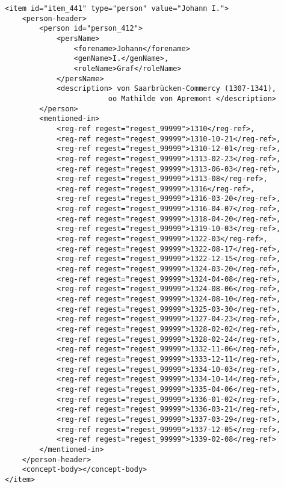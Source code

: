 \begin{verbatim}
<item id="item_441" type="person" value="Johann I.">
    <person-header>
        <person id="person_412">
            <persName>
                <forename>Johann</forename>
                <genName>I.</genName>,
                <roleName>Graf</roleName>
            </persName>
            <description> von Saarbrücken-Commercy (1307-1341),
                        oo Mathilde von Apremont </description>
        </person>
        <mentioned-in>
            <reg-ref regest="regest_99999">1310</reg-ref>,
            <reg-ref regest="regest_99999">1310-10-21</reg-ref>,
            <reg-ref regest="regest_99999">1310-12-01</reg-ref>,
            <reg-ref regest="regest_99999">1313-02-23</reg-ref>,
            <reg-ref regest="regest_99999">1313-06-03</reg-ref>,
            <reg-ref regest="regest_99999">1313-08</reg-ref>,
            <reg-ref regest="regest_99999">1316</reg-ref>,
            <reg-ref regest="regest_99999">1316-03-20</reg-ref>,
            <reg-ref regest="regest_99999">1316-04-07</reg-ref>,
            <reg-ref regest="regest_99999">1318-04-20</reg-ref>,
            <reg-ref regest="regest_99999">1319-10-03</reg-ref>,
            <reg-ref regest="regest_99999">1322-03</reg-ref>,
            <reg-ref regest="regest_99999">1322-08-17</reg-ref>,
            <reg-ref regest="regest_99999">1322-12-15</reg-ref>,
            <reg-ref regest="regest_99999">1324-03-20</reg-ref>,
            <reg-ref regest="regest_99999">1324-04-08</reg-ref>,
            <reg-ref regest="regest_99999">1324-08-06</reg-ref>,
            <reg-ref regest="regest_99999">1324-08-10</reg-ref>,
            <reg-ref regest="regest_99999">1325-03-30</reg-ref>,
            <reg-ref regest="regest_99999">1327-04-23</reg-ref>,
            <reg-ref regest="regest_99999">1328-02-02</reg-ref>,
            <reg-ref regest="regest_99999">1328-02-24</reg-ref>,
            <reg-ref regest="regest_99999">1332-11-06</reg-ref>,
            <reg-ref regest="regest_99999">1333-12-11</reg-ref>,
            <reg-ref regest="regest_99999">1334-10-03</reg-ref>,
            <reg-ref regest="regest_99999">1334-10-14</reg-ref>,
            <reg-ref regest="regest_99999">1335-04-06</reg-ref>,
            <reg-ref regest="regest_99999">1336-01-02</reg-ref>,
            <reg-ref regest="regest_99999">1336-03-21</reg-ref>,
            <reg-ref regest="regest_99999">1337-03-29</reg-ref>,
            <reg-ref regest="regest_99999">1337-12-05</reg-ref>,
            <reg-ref regest="regest_99999">1339-02-08</reg-ref>
        </mentioned-in>
    </person-header>
    <concept-body></concept-body>
</item>
\end{verbatim}

